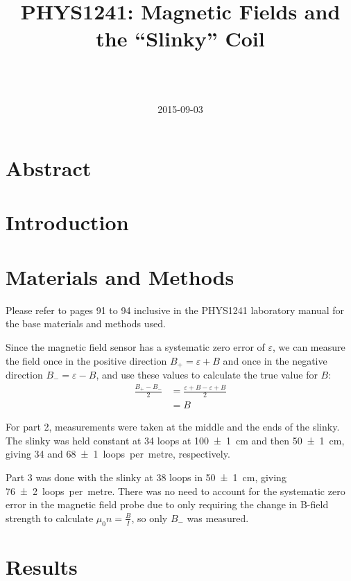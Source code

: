 \documentclass[a4paper]{scrartcl}
\begin{document}
\title{PHYS1241: Magnetic Fields and the ``Slinky'' Coil}
\author{ \\ \\ }
\date{2015-09-03}
\maketitle

\section{Abstract}

\section{Introduction}

\section{Materials and Methods}
Please refer to pages 91 to 94 inclusive in the PHYS1241 laboratory manual for the base materials and methods used.

Since the magnetic field sensor has a systematic zero error of \(\varepsilon\), we can measure the field once in the positive direction \(B_+ = \varepsilon + B\) and once in the negative direction \(B_- = \varepsilon - B\), and use these values to calculate the true value for \(B\):
\begin{align*}
    \frac{B_+ - B_-}{2} &= \frac{\varepsilon + B - \varepsilon + B}{2} \\
    &= B
\end{align*}

For part 2, measurements were taken at the middle and the ends of the slinky. The slinky was held constant at 34 loops at \SI{100 \pm 1}{\centi\metre} and then \SI{50 \pm 1}{\centi\metre}, giving \SI{34}{} and \SI{68 \pm 1}{loops per metre}, respectively.

Part 3 was done with the slinky at 38 loops in \SI{50 \pm 1}{\centi\metre}, giving \SI{76 \pm 2}{loops per metre}. There was no need to account for the systematic zero error in the magnetic field probe due to only requiring the change in B-field strength to calculate \(\mu_0 n = \frac{B}{I}\), so only \(B_-\) was measured.

\section{Results}
\end{document}
